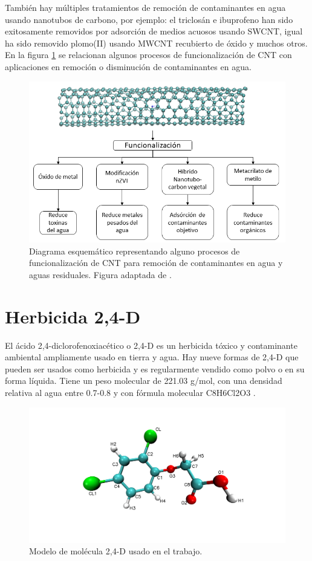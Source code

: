 También hay múltiples tratamientos de remoción de contaminantes en agua usando nanotubos de carbono, por ejemplo: el triclosán e ibuprofeno han sido exitosamente removidos por adsorción de medios acuosos usando SWCNT, igual ha sido removido plomo(II) usando MWCNT recubierto de óxido y muchos otros.\\

En la figura \ref{fig:remocioncontCNT} se relacionan algunos procesos de funcionalización de CNT con aplicaciones en remoción o disminución de contaminantes en agua.


\begin{figure}[!h]
    \centering
    \includegraphics[width=.7\textwidth,keepaspectratio=true]{CNT/esquemafuncCNT.png}
    \caption{Diagrama esquemático representando alguno procesos de funcionalización de CNT para remoción de contaminantes en agua y aguas residuales. Figura adaptada de \cite{SARKAR2018}.}
    \label{fig:remocioncontCNT}
\end{figure}
\newpage

\section{Herbicida 2,4-D}

El ácido 2,4-diclorofenoxiacético o 2,4-D es un herbicida tóxico y contaminante ambiental ampliamente usado en tierra y agua. Hay nueve formas de 2,4-D que pueden ser usados como herbicida y es regularmente vendido como polvo o en su forma líquida. Tiene un peso molecular de 221.03 g/mol, con una densidad relativa al agua entre 0.7-0.8 y con fórmula molecular C8H6Cl2O3 \cite{24dpubchem}.

\begin{figure}[!h]
    \centering
    \includegraphics[width=.7\textwidth,keepaspectratio=true]{24d/24d_label.png}
    \caption{Modelo de molécula 2,4-D usado en el trabajo.}
    \label{fig:24detiquetas}
\end{figure}

